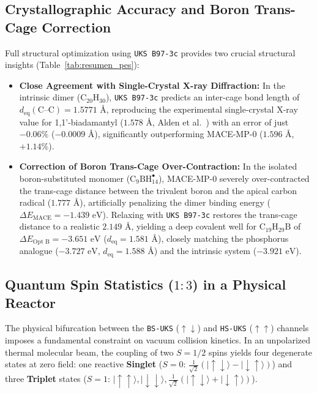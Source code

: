 \documentclass[10pt,twocolumn,a4paper]{article}
\begin{document}
\subsection{Crystallographic Accuracy and Boron Trans-Cage Correction}
Full structural optimization using \texttt{UKS B97-3c} provides two crucial structural insights (Table~\ref{tab:resumen_pes}):
\begin{itemize}
    \item \textbf{Close Agreement with Single-Crystal X-ray Diffraction:} In the intrinsic dimer ($\text{C}_{20}\text{H}_{30}$), \texttt{UKS B97-3c} predicts an inter-cage bond length of $d_{\text{eq}}(\text{C--C}) = 1.5771\text{ \AA}$, reproducing the experimental single-crystal X-ray value for 1,1'-biadamantyl ($1.578\text{ \AA}$, Alden et al.\ \cite{Alden1968}) with an error of just $\mathbf{-0.06\%}$ ($-0.0009\text{ \AA}$), significantly outperforming MACE-MP-0 ($1.596\text{ \AA}$, $+1.14\%$).
    \item \textbf{Correction of Boron Trans-Cage Over-Contraction:} In the isolated boron-substituted monomer ($\text{C}_9\text{BH}_{14}^\bullet$), MACE-MP-0 severely over-contracted the trans-cage distance between the trivalent boron and the apical carbon radical ($1.777\text{ \AA}$), artificially penalizing the dimer binding energy ($\Delta E_{\text{MACE}} = -1.439\text{ eV}$). Relaxing with \texttt{UKS B97-3c} restores the trans-cage distance to a realistic $2.149\text{ \AA}$, yielding a deep covalent well for $\text{C}_{19}\text{H}_{29}\text{B}$ of $\Delta E_{\text{Opt B}} = -3.651\text{ eV}$ ($d_{\text{eq}} = 1.581\text{ \AA}$), closely matching the phosphorus analogue ($-3.727\text{ eV}$, $d_{\text{eq}} = 1.588\text{ \AA}$) and the intrinsic system ($-3.921\text{ eV}$).
\end{itemize}

\subsection{Quantum Spin Statistics ($1:3$) in a Physical Reactor}
The physical bifurcation between the \texttt{BS-UKS} ($\uparrow\downarrow$) and \texttt{HS-UKS} ($\uparrow\uparrow$) channels imposes a fundamental constraint on vacuum collision kinetics. In an unpolarized thermal molecular beam, the coupling of two $S=1/2$ spins yields four degenerate states at zero field: one reactive \textbf{Singlet} ($S=0$: $\frac{1}{\sqrt{2}}(\lvert\uparrow\downarrow\rangle - \lvert\downarrow\uparrow\rangle)$) and three \textbf{Triplet} states ($S=1$: $\lvert\uparrow\uparrow\rangle, \lvert\downarrow\downarrow\rangle, \frac{1}{\sqrt{2}}(\lvert\uparrow\downarrow\rangle + \lvert\downarrow\uparrow\rangle)$).
\end{document}
